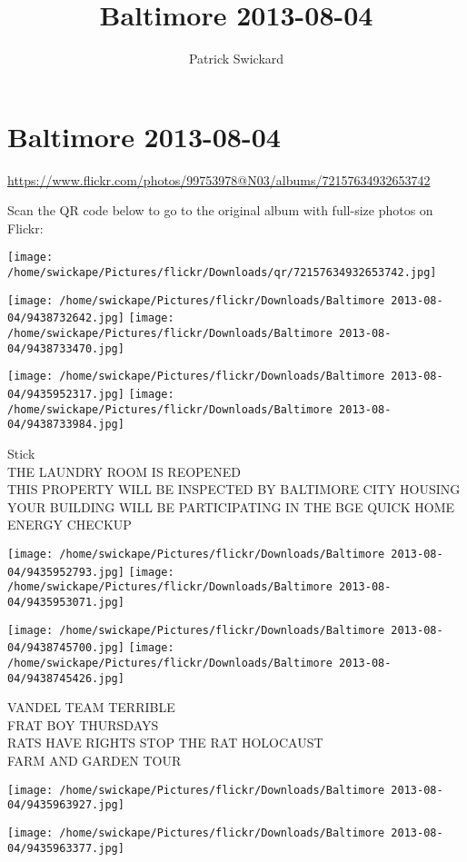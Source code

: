 \documentclass[10pt,letterpaper]{article}
\title{Baltimore 2013-08-04}
\author{Patrick Swickard}
\date{}
\begin{document}
\section*{Baltimore 2013-08-04}

\url{https://www.flickr.com/photos/99753978@N03/albums/72157634932653742}

Scan the QR code below to go to the original album with full-size photos on Flickr:

\texttt{[image: /home/swickape/Pictures/flickr/Downloads/qr/72157634932653742.jpg]}
\pagebreak

\texttt{[image: /home/swickape/Pictures/flickr/Downloads/Baltimore 2013-08-04/9438732642.jpg]}
\texttt{[image: /home/swickape/Pictures/flickr/Downloads/Baltimore 2013-08-04/9438733470.jpg]}

\texttt{[image: /home/swickape/Pictures/flickr/Downloads/Baltimore 2013-08-04/9435952317.jpg]}
\texttt{[image: /home/swickape/Pictures/flickr/Downloads/Baltimore 2013-08-04/9438733984.jpg]}

Stick\\
THE LAUNDRY ROOM IS REOPENED\\
THIS PROPERTY WILL BE INSPECTED BY BALTIMORE CITY HOUSING\\
YOUR BUILDING WILL BE PARTICIPATING IN THE BGE QUICK HOME ENERGY CHECKUP
\pagebreak

\texttt{[image: /home/swickape/Pictures/flickr/Downloads/Baltimore 2013-08-04/9435952793.jpg]}
\texttt{[image: /home/swickape/Pictures/flickr/Downloads/Baltimore 2013-08-04/9435953071.jpg]}

\texttt{[image: /home/swickape/Pictures/flickr/Downloads/Baltimore 2013-08-04/9438745700.jpg]}
\texttt{[image: /home/swickape/Pictures/flickr/Downloads/Baltimore 2013-08-04/9438745426.jpg]}

VANDEL TEAM TERRIBLE\\
FRAT BOY THURSDAYS\\
RATS HAVE RIGHTS STOP THE RAT HOLOCAUST\\
FARM AND GARDEN TOUR
\pagebreak

\texttt{[image: /home/swickape/Pictures/flickr/Downloads/Baltimore 2013-08-04/9435963927.jpg]}

\vspace{0.25in}
\texttt{[image: /home/swickape/Pictures/flickr/Downloads/Baltimore 2013-08-04/9435963377.jpg]}
\end{document}
